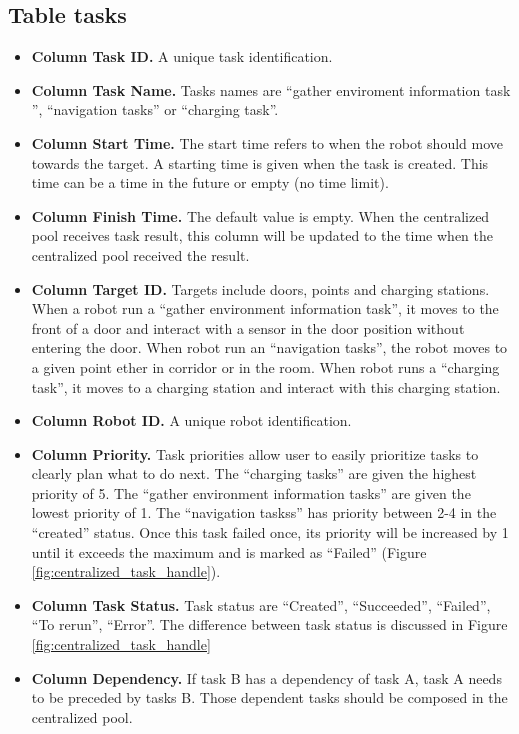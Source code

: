 \subsection*{Table tasks}
\begin{itemize}
    \label{sec:task_table}
    \item \textbf{Column Task ID.} A unique task identification.
    \item \textbf{Column Task Name.} Tasks names are ``gather enviroment information task '', ``navigation tasks'' or ``charging task''.
    \item \textbf{Column Start Time.} The start time refers to when the robot should move towards the target. A starting time is given when the task is created. This time can be a time in the future or empty (no time limit). 
    \item \textbf{Column Finish Time.} The default value is empty. When the centralized pool receives task result, this column will be updated to the time when the centralized pool received the result.
    \item \textbf{Column Target ID.} Targets include doors, points and charging stations. When a robot run a ``gather environment information task'', it moves to the front of a door and interact with a sensor in the door position without entering the door. 
    When robot run an ``navigation tasks'', the robot moves to a given point ether in corridor or in the room. When robot runs a ``charging task'', it moves to a charging station and interact with this charging station.
    \item \textbf{Column Robot ID.} A unique robot identification.
    \item \textbf{Column Priority.} Task priorities allow user to easily prioritize tasks to clearly plan what to do next. The ``charging tasks'' are given the highest priority of 5. The ``gather environment information tasks'' are given the lowest priority of 1. The ``navigation taskss'' has priority between 2-4 in the ``created'' status. Once this task failed once, its priority will be increased by 1 until it exceeds the maximum and is marked as ``Failed'' (Figure \ref{fig:centralized_task_handle}).
    \item \textbf{Column Task Status.} Task status are ``Created'', ``Succeeded'', ``Failed'', ``To rerun'', ``Error''. The difference between task status is discussed in Figure \ref{fig:centralized_task_handle}
    \item \textbf{Column Dependency.} If task B has a dependency of task A, task A needs to be preceded by tasks B. Those dependent tasks should be composed in the centralized pool.

\end{itemize}
